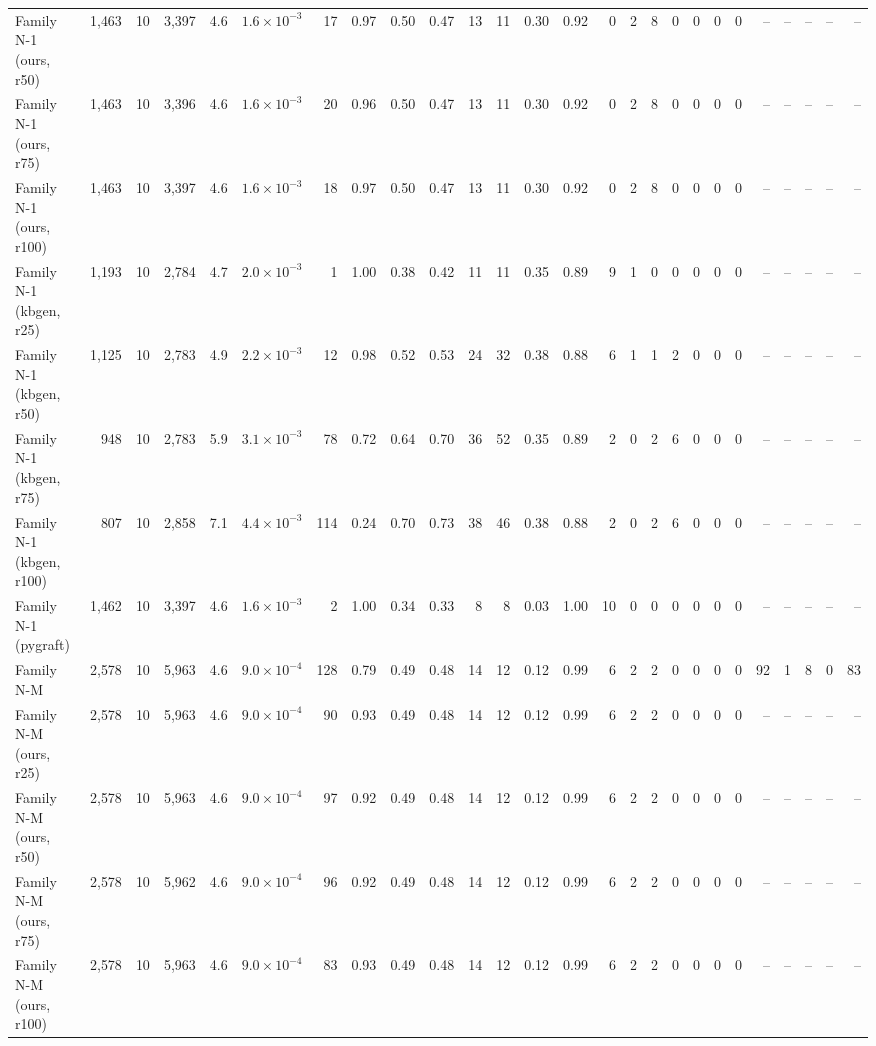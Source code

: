 \begin{tabular}{lrrrrrrrrrrrrrrrrrrrrrrrrr}
Family N-1 (ours, r50) & 1{,}463 & 10 & 3{,}397 & 4.6 & $1.6\times10^{-3}$ & 17 & 0.97 & 0.50 & 0.47 & 13 & 11 & 0.30 & 0.92 & 0 & 2 & 8 & 0 & 0 & 0 & 0 & – & – & – & – & – \\
Family N-1 (ours, r75) & 1{,}463 & 10 & 3{,}396 & 4.6 & $1.6\times10^{-3}$ & 20 & 0.96 & 0.50 & 0.47 & 13 & 11 & 0.30 & 0.92 & 0 & 2 & 8 & 0 & 0 & 0 & 0 & – & – & – & – & – \\
Family N-1 (ours, r100) & 1{,}463 & 10 & 3{,}397 & 4.6 & $1.6\times10^{-3}$ & 18 & 0.97 & 0.50 & 0.47 & 13 & 11 & 0.30 & 0.92 & 0 & 2 & 8 & 0 & 0 & 0 & 0 & – & – & – & – & – \\
Family N-1 (kbgen, r25) & 1{,}193 & 10 & 2{,}784 & 4.7 & $2.0\times10^{-3}$ & 1 & 1.00 & 0.38 & 0.42 & 11 & 11 & 0.35 & 0.89 & 9 & 1 & 0 & 0 & 0 & 0 & 0 & – & – & – & – & – \\
Family N-1 (kbgen, r50) & 1{,}125 & 10 & 2{,}783 & 4.9 & $2.2\times10^{-3}$ & 12 & 0.98 & 0.52 & 0.53 & 24 & 32 & 0.38 & 0.88 & 6 & 1 & 1 & 2 & 0 & 0 & 0 & – & – & – & – & – \\
Family N-1 (kbgen, r75) & 948 & 10 & 2{,}783 & 5.9 & $3.1\times10^{-3}$ & 78 & 0.72 & 0.64 & 0.70 & 36 & 52 & 0.35 & 0.89 & 2 & 0 & 2 & 6 & 0 & 0 & 0 & – & – & – & – & – \\
Family N-1 (kbgen, r100) & 807 & 10 & 2{,}858 & 7.1 & $4.4\times10^{-3}$ & 114 & 0.24 & 0.70 & 0.73 & 38 & 46 & 0.38 & 0.88 & 2 & 0 & 2 & 6 & 0 & 0 & 0 & – & – & – & – & – \\
Family N-1 (pygraft) & 1{,}462 & 10 & 3{,}397 & 4.6 & $1.6\times10^{-3}$ & 2 & 1.00 & 0.34 & 0.33 & 8 & 8 & 0.03 & 1.00 & 10 & 0 & 0 & 0 & 0 & 0 & 0 & – & – & – & – & – \\
Family N-M & 2{,}578 & 10 & 5{,}963 & 4.6 & $9.0\times10^{-4}$ & 128 & 0.79 & 0.49 & 0.48 & 14 & 12 & 0.12 & 0.99 & 6 & 2 & 2 & 0 & 0 & 0 & 0 & 92 & 1 & 8 & 0 & 83 \\
Family N-M (ours, r25) & 2{,}578 & 10 & 5{,}963 & 4.6 & $9.0\times10^{-4}$ & 90 & 0.93 & 0.49 & 0.48 & 14 & 12 & 0.12 & 0.99 & 6 & 2 & 2 & 0 & 0 & 0 & 0 & – & – & – & – & – \\
Family N-M (ours, r50) & 2{,}578 & 10 & 5{,}963 & 4.6 & $9.0\times10^{-4}$ & 97 & 0.92 & 0.49 & 0.48 & 14 & 12 & 0.12 & 0.99 & 6 & 2 & 2 & 0 & 0 & 0 & 0 & – & – & – & – & – \\
Family N-M (ours, r75) & 2{,}578 & 10 & 5{,}962 & 4.6 & $9.0\times10^{-4}$ & 96 & 0.92 & 0.49 & 0.48 & 14 & 12 & 0.12 & 0.99 & 6 & 2 & 2 & 0 & 0 & 0 & 0 & – & – & – & – & – \\
Family N-M (ours, r100) & 2{,}578 & 10 & 5{,}963 & 4.6 & $9.0\times10^{-4}$ & 83 & 0.93 & 0.49 & 0.48 & 14 & 12 & 0.12 & 0.99 & 6 & 2 & 2 & 0 & 0 & 0 & 0 & – & – & – & – & – \\

\end{tabular}
